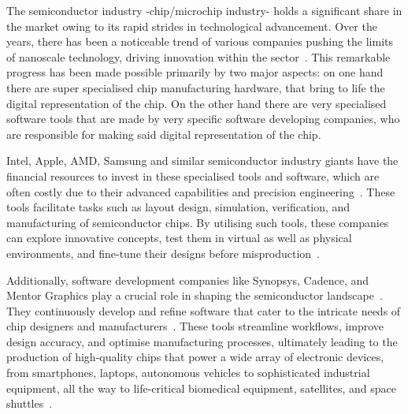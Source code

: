 The semiconductor industry -chip/microchip industry- holds a significant share in the market owing to its rapid strides in technological advancement. Over the years, there has been a noticeable trend of various companies pushing the limits of nanoscale technology, driving innovation within the sector\ \cite{IRDS2020}. This remarkable progress has been made possible primarily by two major aspects: on one hand there are  super specialised chip manufacturing hardware, that bring to life the digital representation of the chip. On the other hand there are very specialised software tools that are made by very specific software developing companies, who are responsible for making said digital representation of the chip. 

Intel, Apple, AMD, Samsung and similar semiconductor industry giants have the financial resources to invest in these specialised tools and software, which are often costly due to their advanced capabilities and precision engineering\ \cite{IntelArizona2021}. These tools facilitate tasks such as layout design, simulation, verification, and manufacturing of semiconductor chips. By utilising such tools, these companies can explore innovative concepts, test them in virtual as well as physical environments, and fine-tune their designs before misproduction\ \cite{SemiconductorManufacturing2023}.

Additionally, software development companies like Synopsys, Cadence, and Mentor Graphics play a crucial role in shaping the semiconductor landscape\ \cite{Freund2021AI}. They continuously develop and refine software that cater to the intricate needs of chip designers and manufacturers\ \cite{SynopsysEDA2023}. These tools streamline workflows, improve design accuracy, and optimise manufacturing processes, ultimately leading to the production of high-quality chips that power a wide array of electronic devices, from smartphones, laptops, autonomous vehicles to sophisticated industrial equipment, all the way to life-critical biomedical equipment, satellites, and space shuttles\ \cite{CadenceDFM2023}. 

